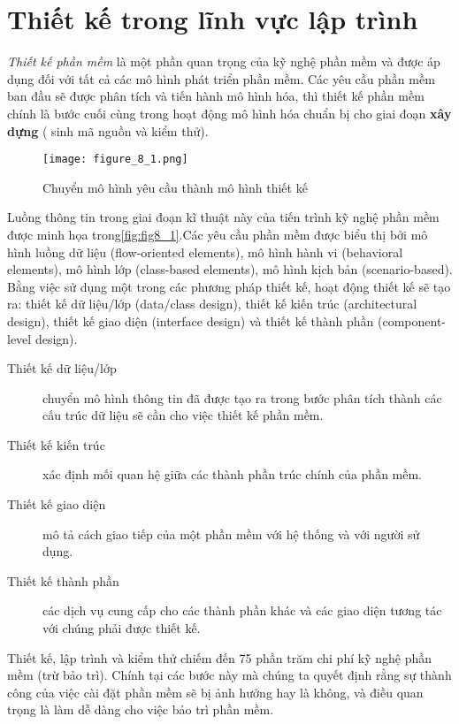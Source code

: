 \documentclass[./../SoftwareEngineering.tex]{subfiles}
\begin{document}
	\section{Thiết kế trong lĩnh vực lập trình}
\textit{Thiết kế phần mềm } là một phần quan trọng của kỹ nghệ phần mềm và được áp dụng đối với tất cả các mô hình phát triển phần mềm. Các yêu cầu phần mềm ban đầu sẽ được phân tích và tiến hành mô hình hóa, thì thiết kế phần mềm chính là bước cuối cùng trong hoạt động mô hình hóa chuẩn bị cho giai đoạn \textbf{xây dựng} ( sinh mã nguồn và kiểm thử).

	
	\begin{figure}[!htb]
		\centering
		\texttt{[image: figure\_8\_1.png]}
		\caption{Chuyển mô hình yêu cầu thành mô hình thiết kế}
		\label{fig:fig8_1}
	\end{figure}
	
	Luồng thông tin trong giai đoạn kĩ thuật này của tiến trình kỹ nghệ phần mềm được minh họa trong\autoref{fig:fig8_1}.Các yêu cầu phần mềm được biểu thị bởi mô hình luồng dữ liệu (flow-oriented elements), mô hình hành vi (behavioral elements), mô hình lớp (class-based elements), mô hình kịch bản (scenario-based). Bằng việc sử dụng một trong các phương pháp thiết kế, hoạt động thiết kế sẽ tạo ra:  thiết kế dữ liệu/lớp (data/class design), thiết kế kiến trúc (architectural design), thiết kế giao diện (interface design) và thiết kế thành phần (component-level design).
	
	
	

	\begin{description}
		\item[Thiết kế dữ liệu/lớp] chuyển mô hình thông tin đã được tạo ra trong bước phân tích thành các cấu trúc dữ liệu sẽ cần cho việc thiết kế phần mềm. 
		\item[Thiết kế kiến trúc] xác định mối quan hệ giữa các thành phần trúc chính của phần mềm. 
		\item[Thiết kế giao diện] mô tả cách giao tiếp của một phần mềm với hệ thống và với người sử dụng. 
		\item[Thiết kế thành phần] các dịch vụ cung cấp cho các thành phần khác và các giao diện tương tác với chúng phải được thiết kế. 
	\end{description}
	
	Thiết kế, lập trình và kiểm thử chiếm đến 75 phần trăm chi phí kỹ nghệ phần mềm (trừ bảo trì). Chính tại các bước này mà chúng ta quyết định rằng sự thành công của việc cài đặt phần mềm sẽ bị ảnh hưởng hay là không, và điều quan trọng là làm dễ dàng cho việc bảo trì phần mềm. 
	
\end{document}
